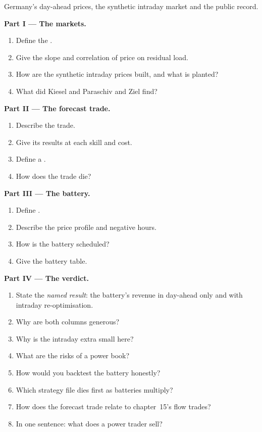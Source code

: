 \begin{problem}\label{pb:s2:power-and-gas-trading:1}
Germany's day-ahead prices, the synthetic intraday market and the public record.

\medskip\noindent\textbf{Part I --- The markets.}
\begin{enumerate}
\item Define the .
\item Give the slope and correlation of price on residual load.
\item How are the synthetic intraday prices built, and what is planted?
\item What did Kiesel and Paraschiv and Ziel find?
\end{enumerate}

\medskip\noindent\textbf{Part II --- The forecast trade.}
\begin{enumerate}[resume]
\item Describe the trade.
\item Give its results at each skill and cost.
\item Define a .
\item How does the trade die?
\end{enumerate}

\medskip\noindent\textbf{Part III --- The battery.}
\begin{enumerate}[resume]
\item Define .
\item Describe the price profile and negative hours.
\item How is the battery scheduled?
\item Give the battery table.
\end{enumerate}

\medskip\noindent\textbf{Part IV --- The verdict.}
\begin{enumerate}[resume]
\item State the \emph{named result}: the battery's revenue in day-ahead only and with intraday re-optimisation.
\item Why are both columns generous?
\item Why is the intraday extra small here?
\item What are the risks of a power book?
\item How would you backtest the battery honestly?
\item Which strategy file dies first as batteries multiply?
\item How does the forecast trade relate to chapter~15's flow trades?
\item In one sentence: what does a power trader sell?
\end{enumerate}
\end{problem}

